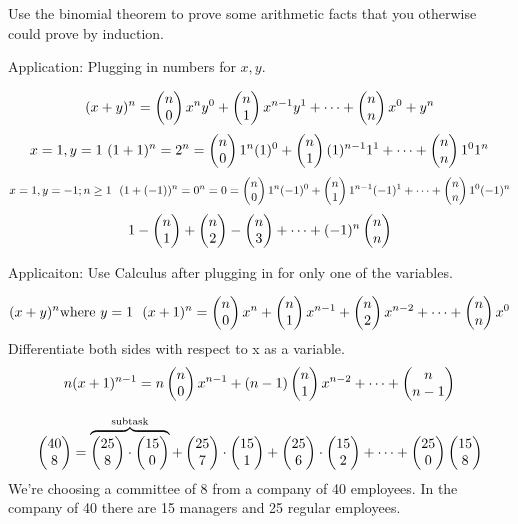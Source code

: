 Use the binomial theorem to prove some arithmetic facts that you otherwise could prove by induction.
\begin{example}
Application: Plugging in numbers for $x,y$.

\[ (x+y)^n = \begin{pmatrix}n\\0\end{pmatrix}x^ny^0+\begin{pmatrix}n\\1\end{pmatrix}x^{n-1}y^1+\cdots+\begin{pmatrix}n\\n\end{pmatrix}x^0+y^n \]
\[ x=1,y=1\ (1+1)^n = 2^n = \begin{pmatrix}n\\0\end{pmatrix}1^n(1)^0+\begin{pmatrix}n\\1\end{pmatrix}(1)^{n-1}1^1+\cdots+\begin{pmatrix}n\\n\end{pmatrix}1^01^n\]
\[ x=1,y=-1;n\ge1\ \ (1+(-1))^n = 0^n = 0 = \begin{pmatrix}n\\0\end{pmatrix}1^n(-1)^0+\begin{pmatrix}n\\1\end{pmatrix}1^{n-1}(-1)^1+\cdots+\begin{pmatrix}n\\n\end{pmatrix}1^0(-1)^n\]
\[ 1-\begin{pmatrix}n\\1\end{pmatrix}+\begin{pmatrix}n\\2\end{pmatrix}-\begin{pmatrix}n\\3\end{pmatrix}+\cdots+(-1)^n\begin{pmatrix}n\\n\end{pmatrix}\]
\end{example}
\begin{example}
Applicaiton: Use Calculus after plugging in for only one of the variables.

\[ (x+y)^n \text{where } y=1\ \ (x+1)^n = \begin{pmatrix}n\\0\end{pmatrix}x^n+\begin{pmatrix}n\\1\end{pmatrix}x^{n-1}+\begin{pmatrix}n\\2\end{pmatrix}x^{n-2}+\cdots+\begin{pmatrix}n\\n\end{pmatrix}x^0\]
Differentiate both sides with respect to x as a variable.
\[ n(x+1)^{n-1} = n\begin{pmatrix}n\\0\end{pmatrix}x^{n-1}+(n-1)\begin{pmatrix}n\\1\end{pmatrix}x^{n-2}+\cdots+\begin{pmatrix}n\\n-1\end{pmatrix}\]
\end{example}
\begin{example}
\[ \begin{pmatrix}40\\8\end{pmatrix} = \overbrace{\begin{pmatrix}25\\8\end{pmatrix}\cdot\begin{pmatrix}15\\0\end{pmatrix}}^{\text{subtask}}+\begin{pmatrix}25\\7\end{pmatrix}\cdot\begin{pmatrix}15\\1\end{pmatrix}+\begin{pmatrix}25\\6\end{pmatrix}\cdot\begin{pmatrix}15\\2\end{pmatrix}+\cdots+\begin{pmatrix}25\\0\end{pmatrix}\begin{pmatrix}15\\8\end{pmatrix} \]
We're choosing a committee of 8 from a company of 40 employees. In the company of 40 there are 15 managers and 25 regular employees.
\end{example}


